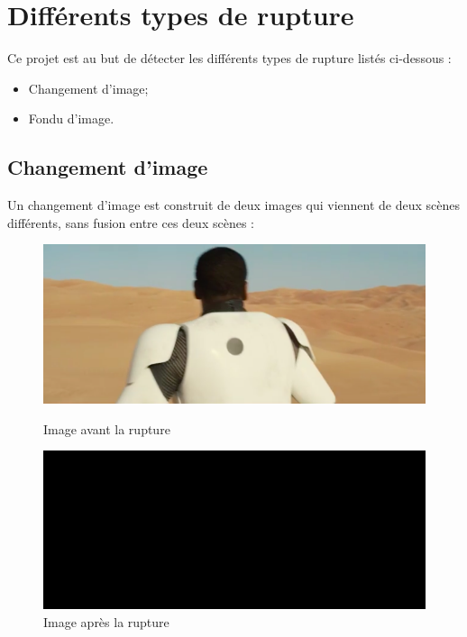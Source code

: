 \section{Différents types de rupture}

Ce projet est au but de détecter les différents types de rupture listés ci-dessous :

\begin{itemize}
	\item Changement d’image;
	\item Fondu d’image.
\end{itemize}

\subsection{Changement d’image}
Un changement d’image est construit de deux images qui viennent de deux scènes différents, sans fusion entre ces deux scènes :

\begin{figure}[h!]
   \begin{minipage}[c]{.46\linewidth}
	  \centering
      \includegraphics[scale=0.3]{img/rupture1-1.png}
      \caption{\label{Avant} Image avant la rupture}
   \end{minipage} \hfill
   \begin{minipage}[c]{.46\linewidth}
      \centering
      \includegraphics[scale=0.3]{img/rupture1-2.png}
      \caption{\label{Après} Image après la rupture}
   \end{minipage}
\end{figure}


